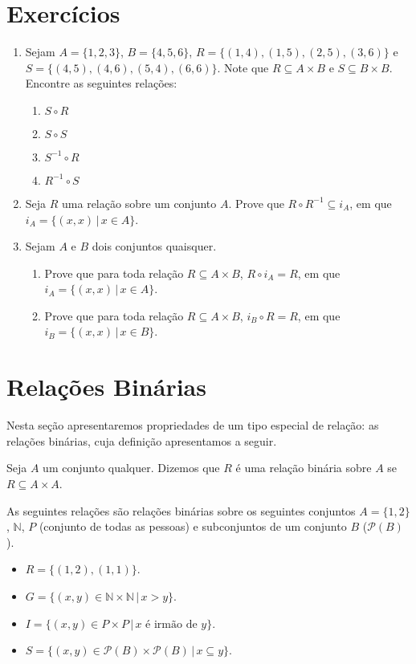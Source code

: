 \section{Exercícios}

\begin{enumerate}
	\item Sejam $A=\{1,2,3\}$, $B=\{4,5,6\}$, $R=\{(1,4), (1,5), (2,5), (3,6)\}$ e $S=\{(4,5), (4,6), (5,4), (6,6)\}$.
	      Note que $R\subseteq A\times B$ e $S\subseteq B\times B$. Encontre as seguintes rela\c{c}\~oes:
	\begin{enumerate}
		\item $S\circ R$
		\item $S\circ S$
		\item $S^{-1}\circ R$
		\item $R^{-1}\circ S$
	\end{enumerate}
	\item Seja $R$ uma rela\c{c}\~ao sobre um conjunto $A$. Prove que
          $R\circ R^{-1}\subseteq i_{A}$, em que $i_{A}=\{(x,x)\,|\,x\in A\}$.
	\item Sejam $A$ e $B$ dois conjuntos quaisquer.
	\begin{enumerate}
		\item Prove que para toda rela\c{c}\~ao $R\subseteq A\times B$, $R\circ i_{A} = R$, em que $i_{A}=\{(x,x)\,|\,x\in A\}$.
		\item Prove que para toda rela\c{c}\~ao $R\subseteq A\times B$, $i_{B}\circ R = R$, em que $i_{B}=\{(x,x)\,|\,x\in B\}$.
	\end{enumerate}
\end{enumerate}

\section{Relações Binárias}

Nesta seção apresentaremos propriedades de um tipo especial de
relação: as relações binárias, cuja definição apresentamos a seguir.

\begin{Definition}
Seja $A$ um conjunto qualquer. Dizemos que $R$ é uma relação binária
sobre $A$ se $R \subseteq A\times A$.
\end{Definition}

\begin{Example}
As seguintes relações são relações binárias sobre os seguintes
conjuntos $A = \{1,2\}$, $\mathbb{N}$, $P$ (conjunto de todas as
pessoas) e subconjuntos de um conjunto $B$ ($\mathcal{P}(B)$).
\begin{itemize}
  \item $R = \{(1,2),(1,1)\}$.
  \item $G = \{(x,y)\in \mathbb{N}\times\mathbb{N}\,|\,x > y\}$.
  \item $I =\{(x,y)\in P \times P\,|\,x\text{ é irmão de }y\}$.
  \item $S = \{(x,y)\in \mathcal{P}(B)\times\mathcal{P}(B)\,|\,x
    \subseteq y\}$.
\end{itemize}
\end{Example}

